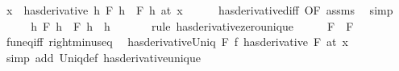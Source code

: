 \begin{isabellebody}
\ {\isachardoublequoteopen}{\isacharparenleft}{\kern0pt}{\isacharparenleft}{\kern0pt}{\isasymlambda}x{\isachardot}{\kern0pt}\ {}{\isacharparenright}{\kern0pt}\ has{\isacharunderscore}{\kern0pt}derivative\ {\isacharparenleft}{\kern0pt}{\isasymlambda}h{\isachardot}{\kern0pt}\ F\ h\ {\isacharminus}{\kern0pt}\ F{\isacharprime}{\kern0pt}\ h{\isacharparenright}{\kern0pt}{\isacharparenright}{\kern0pt}\ {\isacharparenleft}{\kern0pt}at\ x{\isacharparenright}{\kern0pt}{\isachardoublequoteclose}\isanewline
\ \ \ \ \isamarkupfalse%
\ has{\isacharunderscore}{\kern0pt}derivative{\isacharunderscore}{\kern0pt}diff\ {\isacharbrackleft}{\kern0pt}OF\ assms{\isacharbrackright}{\kern0pt}\ \isamarkupfalse%
\ simp\isanewline
\ \ \isamarkupfalse%
\ \isamarkupfalse%
\ {\isachardoublequoteopen}{\isacharparenleft}{\kern0pt}{\isasymlambda}h{\isachardot}{\kern0pt}\ F\ h\ {\isacharminus}{\kern0pt}\ F{\isacharprime}{\kern0pt}\ h{\isacharparenright}{\kern0pt}\ {\isacharequal}{\kern0pt}\ {\isacharparenleft}{\kern0pt}{\isasymlambda}h{\isachardot}{\kern0pt}\ {}{\isacharparenright}{\kern0pt}{\isachardoublequoteclose}\isanewline
\ \ \ \ \isamarkupfalse%
\ {\isacharparenleft}{\kern0pt}rule\ has{\isacharunderscore}{\kern0pt}derivative{\isacharunderscore}{\kern0pt}zero{\isacharunderscore}{\kern0pt}unique{\isacharparenright}{\kern0pt}\isanewline
\ \ \isamarkupfalse%
\ \isamarkupfalse%
\ {\isachardoublequoteopen}F\ {\isacharequal}{\kern0pt}\ F{\isacharprime}{\kern0pt}{\isachardoublequoteclose}\isanewline
\ \ \ \ \isamarkupfalse%
\ fun{\isacharunderscore}{\kern0pt}eq{\isacharunderscore}{\kern0pt}iff\ right{\isacharunderscore}{\kern0pt}minus{\isacharunderscore}{\kern0pt}eq\ \isacommand{{\isachardot}{\kern0pt}}\isamarkupfalse%
\isanewline
{}\isamarkupfalse%
%
\endisatagproof
{\isafoldproof}%
%
\isadelimproof
\isanewline
%
\endisadelimproof
\isanewline
{}\isamarkupfalse%
\ has{\isacharunderscore}{\kern0pt}derivative{\isacharunderscore}{\kern0pt}Uniq{\isacharcolon}{\kern0pt}\ {\isachardoublequoteopen}{\isasymexists}\isactrlsub {\isasymle}F{\isachardot}{\kern0pt}\ {\isacharparenleft}{\kern0pt}f\ has{\isacharunderscore}{\kern0pt}derivative\ F{\isacharparenright}{\kern0pt}\ {\isacharparenleft}{\kern0pt}at\ x{\isacharparenright}{\kern0pt}{\isachardoublequoteclose}\isanewline
%
\isadelimproof
\ \ %
\endisadelimproof
%
\isatagproof
{}\isamarkupfalse%
\ {\isacharparenleft}{\kern0pt}simp\ add{\isacharcolon}{\kern0pt}\ Uniq{\isacharunderscore}{\kern0pt}def\ has{\isacharunderscore}{\kern0pt}derivative{\isacharunderscore}{\kern0pt}unique{\isacharparenright}{\kern0pt}%

\end{isabellebody}
